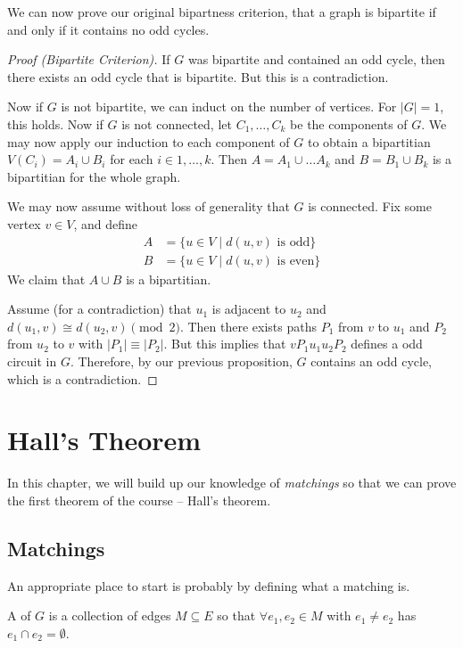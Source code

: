 \documentclass[a4paper]{scrreprt}
\begin{document}
We can now prove our original bipartness criterion, that a graph is bipartite if and only if it contains no odd cycles.

\begin{proof}[Proof (Bipartite Criterion)]
	If $G$ was bipartite and contained an odd cycle, then there exists an odd cycle that is bipartite. But this is a contradiction.

	Now if $G$ is not bipartite, we can induct on the number of vertices. For $|G| = 1$, this holds. Now if $G$ is not connected, let $C_1, \dots, C_k$ be the components of $G$. We may now apply our induction to each component of $G$ to obtain a bipartitian $V(C_i) = A_i \cup B_i$ for each $i \in 1, \dots, k$. Then $A = A_1 \cup \dots A_k$ and $B = B_1 \cup B_k$ is a bipartitian for the whole graph. 
	
	We may now assume without loss of generality that $G$ is connected. Fix some vertex $v \in V$, and define 
	\begin{align*}
		A &= \{u \in V \mid d(u, v) \text{ is odd} \} \\
		B &=  \{u \in V \mid d(u, v) \text{ is even} \}
	\end{align*}
	We claim that $A \cup B$ is a bipartitian.

	Assume (for a contradiction) that $u_1$ is adjacent to $u_2$ and $d(u_1, v) \cong d(u_2, v) \pmod{2}$. Then there exists paths $P_1$ from $v$ to $u_1$ and $P_2$ from $u_2$ to $v$ with $|P_1| \equiv |P_2|$. But this implies that $vP_1u_1 u_2 P_2$ defines a odd circuit in $G$. Therefore, by our previous proposition, $G$ contains an odd cycle, which is a contradiction. 
\end{proof}

\chapter{Hall's Theorem}

In this chapter, we will build up our knowledge of \emph{matchings} so that we can prove the first theorem of the course -- Hall's theorem.

\section{Matchings}

An appropriate place to start is probably by defining what a matching is.

\begin{definition}[Matching]
	A  of $G$ is a collection of edges $M \subseteq E$ so that $\forall e_1, e_2 \in M$ with $e_1 \neq e_2$ has $e_1 \cap e_2 = \emptyset$.
\end{definition}
\end{document}
